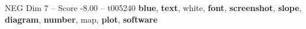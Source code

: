 \begin{textsample}{NEG Dim 7 – Score -8.00 – t005240}  \label{ex:f7_neg_013}
\textbf{blue}, \textbf{text}, white, \textbf{font}, \textbf{screenshot}, \textbf{slope}, \textbf{diagram}, \textbf{number}, map, \textbf{plot}, \textbf{software}

\end{textsample}
